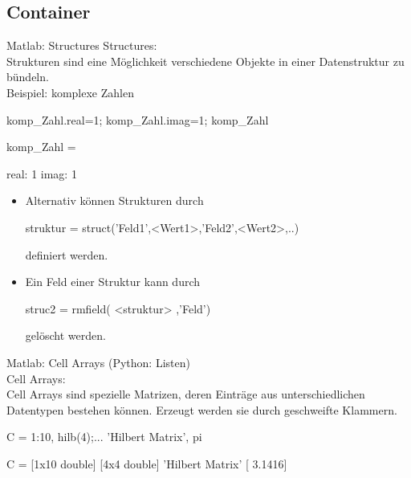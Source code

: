 \documentclass[hyperref={xetex}]{beamer}
\begin{document}
\subsection{Container}
%
%
\begin{frame}[fragile]{Matlab: Structures}
\alert{Structures:}\\
Strukturen sind eine Möglichkeit verschiedene Objekte in einer
Datenstruktur zu bündeln.\\[1cm]

\alert{Beispiel:} komplexe Zahlen
\begin{matlabin}
komp_Zahl.real=1;
komp_Zahl.imag=1;
komp_Zahl
\end{matlabin}
\begin{matlab}
komp_Zahl = 

    real: 1
    imag: 1
\end{matlab}
\end{frame}
%
%
\begin{frame}[fragile]{}
\begin{itemize}
\item Alternativ können Strukturen durch
\begin{matlabin}
struktur = struct('Feld1',<Wert1>,'Feld2',<Wert2>,..)
\end{matlabin}
definiert werden.
\item Ein Feld einer Struktur  kann durch 
\begin{matlabin}
struc2 = rmfield( <struktur> ,'Feld')
\end{matlabin}
gel\"oscht werden. 
\end{itemize}
\end{frame}
%
%
\begin{frame}[fragile]{Matlab: Cell Arrays}
(Python: Listen)\\
\alert{Cell Arrays:} \\
Cell Arrays sind spezielle Matrizen, deren  Einträge aus unterschiedlichen
Datentypen bestehen können. Erzeugt
werden sie durch geschweifte Klammern.\\
\begin{matlabin}
C = { 1:10, hilb(4);...
       'Hilbert Matrix', pi}
\end{matlabin} 
\begin{matlab}
C = 
       [1x10 double]    [4x4 double]
    'Hilbert Matrix'    [    3.1416]
\end{matlab} 
\end{frame}
\end{document}
